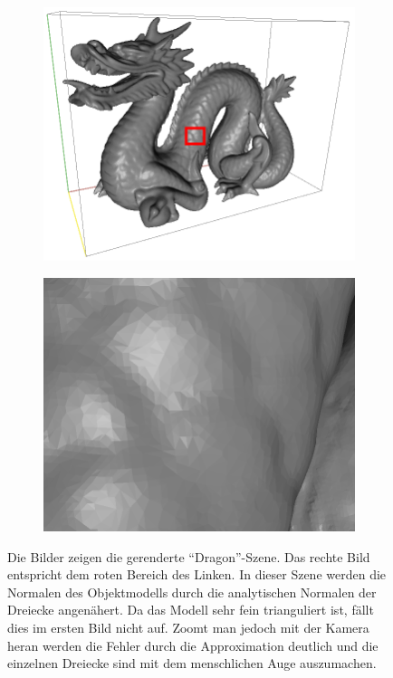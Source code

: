 		\begin{figure}[h]
			\begin{subfigure}[b]{0.5\textwidth}
				\center
				\includegraphics[scale=0.15]{pic/normal_facette-mark.png}
			\end{subfigure}
			\begin{subfigure}[b]{0.5\textwidth}
				\center
				\includegraphics[scale=0.15]{pic/normal_facette-zoom.png}
			\end{subfigure}
			\caption{Die Bilder zeigen die gerenderte \enquote{Dragon}-Szene. Das rechte Bild entspricht dem roten Bereich des Linken. In dieser Szene werden die Normalen des Objektmodells durch die analytischen Normalen der Dreiecke angenähert. Da das Modell sehr fein trianguliert ist, fällt dies im ersten Bild nicht auf. Zoomt man jedoch mit der Kamera heran werden die Fehler durch die Approximation deutlich und die einzelnen Dreiecke sind mit dem menschlichen Auge auszumachen.}
			\label{fig:facette}
		\end{figure}

